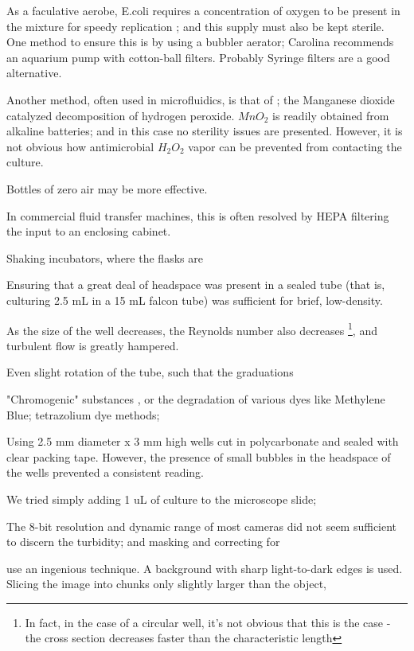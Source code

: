 \documentclass[paper.tex]{subfiles}
\begin{document}
As a faculative aerobe, E.coli requires a concentration of oxygen to be present in the mixture for speedy replication \cite{Effect1965}; and this supply must also be kept sterile. One method to ensure this is by using a bubbler aerator; Carolina recommends an aquarium pump with cotton-ball filters. Probably Syringe filters are a good alternative.

Another method, often used in microfluidics\cite{Microfluidic}, is that of \cite{method1951}; the Manganese dioxide catalyzed decomposition of hydrogen peroxide. $MnO_2$ is readily obtained from alkaline batteries; and in this case no sterility issues are presented. However, it is not obvious how antimicrobial $H_2O_2$ vapor can be prevented from contacting the culture.

Bottles of zero air may be more effective.

In commercial fluid transfer machines, this is often resolved by HEPA filtering the input to an enclosing cabinet.

Shaking incubators, where the flasks are 

Ensuring that a great deal of headspace was present in a sealed tube (that is, culturing 2.5 mL in a 15 mL falcon tube) was sufficient for brief, low-density.



As the size of the well decreases, the Reynolds number also decreases \footnote{In fact, in the case of a circular well, it's not obvious that this is the case - the cross section decreases faster than the characteristic length}, and turbulent flow is greatly hampered.

Even slight rotation of the tube, such that the graduations 

"Chromogenic" substances \cite{Fluorogenic1991}, or the degradation of various dyes like Methylene Blue; tetrazolium dye methods;

Using 2.5 mm diameter x 3 mm high wells cut in polycarbonate and sealed with clear packing tape. However, the presence of small bubbles in the headspace of the wells prevented a consistent reading.

We tried simply adding 1 uL of culture to the microscope slide;

The 8-bit resolution and dynamic range of most cameras did not seem sufficient to discern the turbidity; and masking and correcting for 

\cite{Vision2016} use an ingenious technique. A background with sharp light-to-dark edges is used. Slicing the image into chunks only slightly larger than the object,
\end{document}
